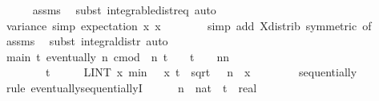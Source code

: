 \documentclass{svjour3}
\begin{document}
{\begin{isabellebody}
\ \ \ \ \isamarkupfalse%
\ assms\ \isamarkupfalse%
\ {\isacharparenleft}subst\ integrable{\isacharunderscore}distr{\isacharunderscore}eq{\isacharcomma}\ auto{\isacharparenright}\isanewline
\ \ \isamarkupfalse%
\ {\isasymmu}{\isacharunderscore}variance\ {\isacharbrackleft}simp{\isacharbrackright}{\isacharcolon}\ {\isachardoublequoteopen}{\isasymmu}{\isachardot}expectation\ {\isacharparenleft}{\isasymlambda}x{\isachardot}\ x{\isacharcircum}{}{\isacharparenright}\ {\isacharequal}\ {\isasymsigma}\isanewline
\ \ \ \ \isamarkupfalse%
\ {\isacharparenleft}simp\ add{\isacharcolon}\ X{\isacharunderscore}distrib\ {\isacharbrackleft}symmetric{\isacharcomma}\ of\ {}{\isacharbrackright}{\isacharparenright}\isanewline
\ \ \ \ \isamarkupfalse%
\ assms\ \isamarkupfalse%
\ {\isacharparenleft}subst\ integral{\isacharunderscore}distr{\isacharcomma}\ auto{\isacharparenright}\isanewline
\isanewline
\ \ \isamarkupfalse%
\ main{\isacharcolon}\ {\isachardoublequoteopen}{\isasymAnd}t{\isachardot}\ eventually\ {\isacharparenleft}{\isasymlambda}n{\isachardot}\ cmod\ {\isacharparenleft}{\isasymphi}\ n\ t\ {\isacharminus}\ {\isacharparenleft}{}\ {\isacharplus}\ {\isacharparenleft}{\isacharminus}{\isacharparenleft}t{\isacharcircum}{}{\isacharparenright}\ {\isacharslash}\ {}{\isacharparenright}\ {\isacharslash}\ n{\isacharparenright}{\isacharcircum}n{\isacharparenright}\ {\isasymle}\ \isanewline
\ \ \ \ \ \ \ \ {\isacharparenleft}t\ {\isacharslash}\ {\isacharparenleft}{}\ {\isacharasterisk}\ {\isasymsigma}\ {\isacharasterisk}\ {\isacharparenleft}LINT\ x{\isacharbar}{\isasymmu}{\isachardot}\ min\ {\isacharparenleft}{}\ {\isacharasterisk}\ x\ {\isacharparenleft}{\isasymbar}t\ {\isacharslash}\ sqrt\ {\isacharparenleft}{\isasymsigma}\ {\isacharasterisk}\ n{\isacharparenright}{\isasymbar}\ {\isacharasterisk}\ {\isasymbar}x{\isasymbar}\ {\isacharcircum}\ {}{\isacharparenright}{\isacharparenright}{\isacharparenright}{\isacharparenright}\isanewline
\ \ \ \ \ \ sequentially{\isachardoublequoteclose}\isanewline
\ \ \isamarkupfalse%
\ {\isacharparenleft}rule\ eventually{\isacharunderscore}sequentiallyI{\isacharparenright}\isanewline
\ \ \ \ \isamarkupfalse%
\ n\ {\isacharcolon}{\isacharcolon}\ nat\ \ t\ {\isacharcolon}{\isacharcolon}\ real\isanewline

\end{isabellebody}}
\end{document}
